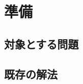 \chapter{準備}
\label{chap:preliminaries}

\section{対象とする問題}
\label{sec:problem}

\section{既存の解法}
\label{sec:existing-method}
